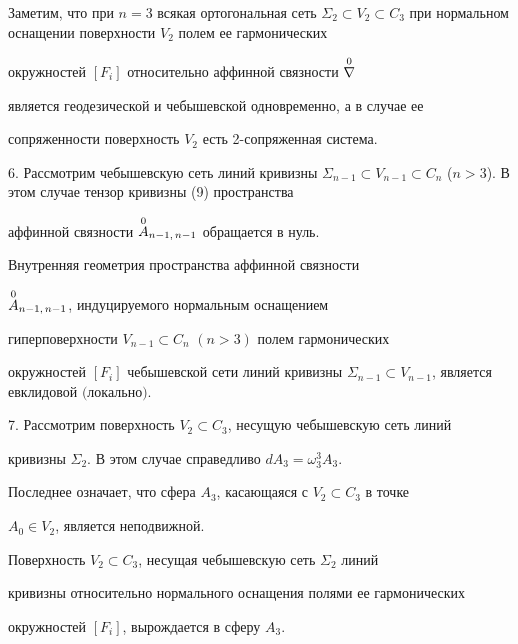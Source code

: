  


Заметим, что при $n=3$ всякая ортогональная сеть $\Sigma_2\subset V_2\subset 


C_3$ при нормальном оснащении поверхности $V_2$ полем ее гармонических 


окружностей $[F_i]$ относительно аффинной связности $\overset{0}{\nabla}{}$ 


является геодезической и чебышевской одновременно, а в случае ее 


сопряженности поверхность $V_2$ есть 2-сопряженная система. 


\medskip 


 


6. Рассмотрим чебышевскую сеть линий кривизны $\Sigma_{n-1}\subset 


V_{n-1}\subset C_n$ ($n>3$). В этом случае тензор кривизны (9) пространства 


аффинной связности $\overset{0}{A}{}_{n-1,\,n-1}$ обращается в нуль. 


 


 


\begin{thm} 


Внутренняя геометрия пространства аффинной связности 


$\overset{0}{A}{}_{n-1,\,n-1}$, индуцируемого нормальным оснащением 


гиперповерхности $V_{n-1}\subset C_n$ $(n>3)$ полем гармонических 


окружностей $[F_i]$ чебышевской сети линий кривизны $\Sigma_{n-1}\subset 


V_{n-1}$, является евклидовой $($локально$)$. 


\end{thm} 


 


 


7. Рассмотрим поверхность $V_2\subset C_3$, несущую чебышевскую сеть линий 


кривизны $\Sigma_2$. В этом случае справедливо $dA_3=\omega^3_3A_3$. 


Последнее означает, что сфера $A_3$, касающаяся с $V_2\subset C_3$ в точке 


$A_0\in V_2$, является неподвижной. 


 


 


\begin{thm} 


Поверхность $V_2\subset C_3$, несущая чебышевскую сеть $\Sigma_2$ линий 


кривизны относительно нормального оснащения полями ее гармонических 


окружностей $[F_i]$, вырождается в сферу $A_3$. 


\end{thm} 


